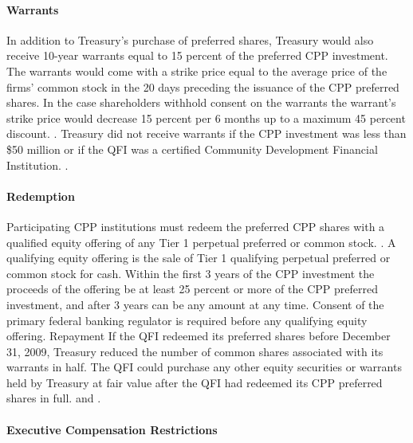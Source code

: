 \documentclass[12pt]{article}
\begin{document}
\paragraph{Warrants}

In addition to Treasury's purchase of preferred shares, Treasury would also receive 10-year warrants equal to 15 percent of the preferred CPP investment. The warrants would come with a strike price equal to the average price of the firms' common stock in the 20 days preceding the issuance of the CPP preferred shares. In the case shareholders withhold consent on the warrants the warrant's strike price would decrease 15 percent per 6 months up to a maximum 45 percent discount. \citep{CPPAnnouncement}. Treasury did not receive warrants if the CPP investment was less than \$50 million or if the QFI was a certified Community Development Financial Institution. \citep{mofo}. 

\paragraph{Redemption}

Participating CPP institutions must redeem the preferred CPP shares with a qualified equity offering of any Tier 1 perpetual preferred or common stock. \citep{CPPAnnouncement}. A qualifying equity offering is the sale of Tier 1 qualifying perpetual preferred or common stock for cash. Within the first 3 years of the CPP investment the proceeds of the offering be at least 25 percent or more of the CPP preferred investment, and after 3 years can be any amount at any time. Consent of the primary federal banking regulator is required before any qualifying equity offering. Repayment If the QFI redeemed its preferred shares before December 31, 2009, Treasury reduced the number of common shares associated with its warrants in half. The QFI could purchase any other equity securities or warrants held by Treasury at fair value after the QFI had redeemed its CPP preferred shares in full. \citep{CPPTerms} and \citep{mofo2}. 

\paragraph{Executive Compensation Restrictions}
\end{document}
